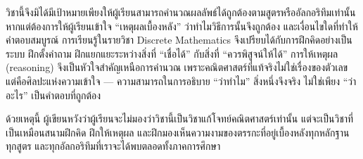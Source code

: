 วิชานี้จึงมิได้มีเป้าหมายเพียงให้ผู้เรียนสามารถคำนวณผลลัพธ์ได้ถูกต้องตามสูตรหรืออัลกอริทึมเท่านั้นหากแต่ต้องการให้ผู้เรียนเข้าใจ “เหตุผลเบื้องหลัง” ว่าทำไมวิธีการนั้นจึงถูกต้อง และเงื่อนไขใดที่ทำให้คำตอบสมบูรณ์ การเรียนรู้ในรายวิชา Discrete Mathematics จึงเปรียบได้กับการฝึกคิดอย่างเป็นระบบ ฝึกตั้งคำถาม ฝึกแยกแยะระหว่างสิ่งที่ “เชื่อได้” กับสิ่งที่ “ควรพิสูจน์ให้ได้” การให้เหตุผล (reasoning) จึงเป็นหัวใจสำคัญเหนือการคำนวณ เพราะคณิตศาสตร์ที่แท้จริงไม่ใช่เรื่องของตัวเลข แต่คือศิลปะแห่งความเข้าใจ — ความสามารถในการอธิบาย “ว่าทำไม” สิ่งหนึ่งจึงจริง ไม่ใช่เพียง “ว่าอะไร” เป็นคำตอบที่ถูกต้อง

ด้วยเหตุนี้ ผู้เขียนหวังว่าผู้เรียนจะไม่มองว่าวิชานี้เป็นวิชาแก้โจทย์คณิตศาสตร์เท่านั้น แต่จะเป็นวิชาที่เป็นเหมือนสนามฝึกคิด ฝึกให้เหตุผล และฝึกมองเห็นความงามของตรรกะที่อยู่เบื้องหลังทุกหลักฐาน ทุกสูตร และทุกอัลกอริทึมที่เราจะได้พบตลอดทั้งภาคการศึกษา
